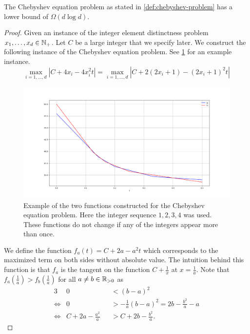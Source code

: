 \begin{lemma}
	The Chebyshev equation problem as stated in \cref{def:chebyshev-problem} has a lower bound of \(\Omega(d \log d)\).
\end{lemma}

\begin{proof}
	Given an instance of the integer element distinctness problem \(x_1, \dots, x_d \in \mathbb{N}_+\). Let \(C\) be a large integer that we specify later. We construct the following instance of the Chebyshev equation problem. See \cref{fig:chebyshev-eq-red} for an example instance.
	\begin{equation}\label{eq:red-eq-chebyshev}
		\max_{i=1, \dots, d} |C + 4x_i - 4x_i^2 t| = \max_{i=1, \dots, d} |C + 2(2x_i + 1) - (2x_i+1)^2 t|
	\end{equation}	

	\begin{figure}
		\centering
		\includegraphics[scale=1, width=0.9\linewidth]{figures/chebyshev-eq-red.png}
		\caption{Example of the two functions constructed for the Chebyshev equation problem. Here the integer sequence \(1, 2, 3, 4\) was used. These functions do not change if any of the integers appear more than once. }
		\label{fig:chebyshev-eq-red}
	\end{figure}


	We define the function \(f_a(t) = C + 2a - a^2 t\) which corresponds to the maximized term on both sides without absolute value. The intuition behind this function is that \(f_a\) is the tangent on the function \(C + \frac{1}{x}\) at \(x = \frac{1}{a}\). Note that \(f_a(\frac{1}{a}) > f_b(\frac{1}{a})\) for all \(a \neq b \in \mathbb{R}_{> 0}\) as 
	\begin{alignat*}{3}
		& 0 &&< (b-a)^2 \\
		\iff & 0 &&> -\frac{1}{a}(b-a)^2 =  2b -\frac{b^2}{a} - a \\
		\iff & C + 2a - \frac{a^2}{a} &&> C + 2b -\frac{b^2}{a}.
	\end{alignat*}


\end{proof}
